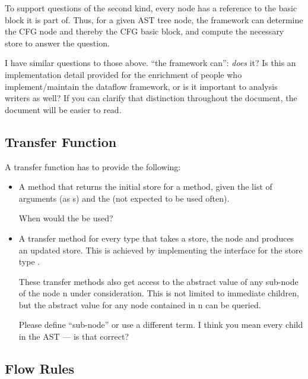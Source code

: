 To support questions of the second kind, every node has a reference
to the basic block it is part of. Thus, for a given AST tree node, the framework
can determine the CFG node and thereby the CFG basic block, and compute the necessary store
to answer the question.

\begin{workinprogress}
I have similar questions to those above.  ``the framework can'':
\emph{does} it?  Is this an implementation detail provided for the
enrichment of people who implement/maintain the dataflow framework, or is
it important to analysis writers as well?  If you can clarify that distinction
throughout the document, the document will be easier to read.
\end{workinprogress}


\subsection{Transfer Function}
\label{sec:transfer-fnc}

A transfer function has to provide the following:
\begin{itemize}
\item A method that returns the initial store for a method, given
the list of arguments (as s)
and the  (not expected to be used often).

\begin{workinprogress}
When would the  be used?
\end{workinprogress}

\item A transfer method for every  type that takes a store, the node and produces
an updated store. This is achieved by implementing the  interface
for the store type .

These transfer methods also get access to the abstract value of any sub-node of the node \code n
under consideration.  This is not limited to immediate children, but the abstract value for any node contained
in \code n can be queried.

\begin{workinprogress}
Please define ``sub-node'' or use a different term.  I think you mean every
child in the AST --- is that correct?
\end{workinprogress}

\end{itemize}


\subsection{Flow Rules}
\label{sec:flow-rules}

